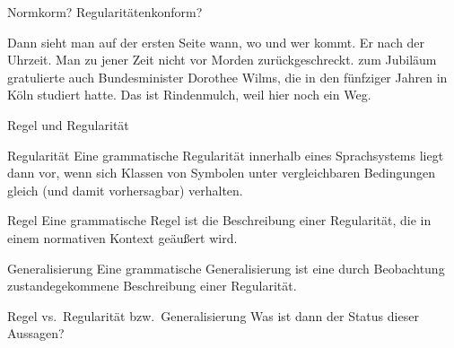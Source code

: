 \begin{frame}
  {Normkorm? Regularitätenkonform?}
  \onslide<+->
  \onslide<+->
  \begin{exe}
    \ex
    \begin{xlist}
      \ex Dann sieht man auf der ersten Seite \alert{wann, wo und wer}  kommt.
      \onslide<+->
      \ex Er  nach der Uhrzeit.
      \onslide<+->
      \ex Man  zu jener Zeit nicht vor Morden \alert{zurückgeschreckt}.
      \onslide<+->
      \ex {} \alert{zum Jubiläum} gratulierte auch Bundesminister Dorothee Wilms, die in den fünfziger Jahren in Köln studiert hatte.
      \onslide<+->
      \ex Das ist Rindenmulch, \alert{weil} hier  noch ein Weg.
    \end{xlist}
  \end{exe}
\end{frame}


\begin{frame}
  {Regel und Regularität}
  \onslide<+->
  \onslide<+->
  \begin{block}{Regularität}
    Eine grammatische Regularität innerhalb eines Sprachsystems liegt dann vor, wenn sich Klassen von Symbolen unter vergleichbaren Bedingungen gleich (und damit vorhersagbar) verhalten.
  \end{block}

  \onslide<+->
  \Halbzeile

  \begin{block}{Regel}
    Eine grammatische Regel ist die Beschreibung einer Regularität, die in einem normativen Kontext geäußert wird.
  \end{block}

  \onslide<+->
  \Halbzeile
  
  \begin{block}{Generalisierung}
    Eine grammatische Generalisierung ist eine durch Beobachtung zustandegekommene Beschreibung einer Regularität.
  \end{block}
\end{frame}

\begin{frame}
  {Regel vs.\ Regularität bzw.\ Generalisierung}
  \onslide<+->
  \onslide<+->
  Was ist dann der Status dieser Aussagen?\\
  \Zeile
  \onslide<+->
  \begin{itemize}
    \Viertelzeile
    \Viertelzeile
    \Viertelzeile
    \Viertelzeile
  \end{itemize}
\end{frame}

